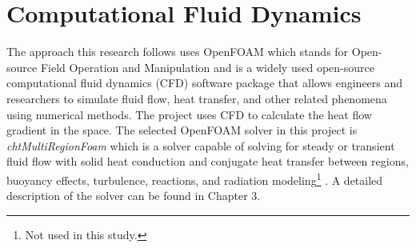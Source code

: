 \section{Computational Fluid Dynamics}
The approach this research follows uses OpenFOAM which stands for Open-source Field Operation and Manipulation and is a widely used open-source computational fluid dynamics  (CFD) software package that allows engineers and researchers to simulate fluid flow, heat transfer, and other related phenomena using numerical methods. The project uses CFD to calculate the heat flow gradient in the space. The selected OpenFOAM solver in this project is \textit{chtMultiRegionFoam} which is a solver capable of solving for steady or transient fluid flow with solid heat conduction and conjugate heat transfer between regions, buoyancy effects, turbulence, reactions, and radiation modeling\footnote{Not used in this study.} \cite{cht}. A detailed description of the solver can be found in Chapter 3.


